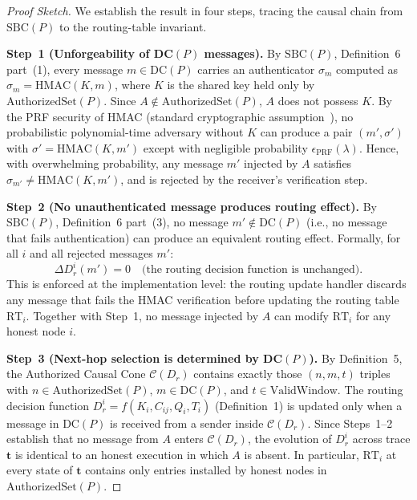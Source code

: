 \begin{proof}[Proof Sketch]
We establish the result in four steps, tracing the causal chain from
$\mathrm{SBC}(P)$ to the routing-table invariant.

\medskip
\noindent\textbf{Step~1 (Unforgeability of DC$(P)$ messages).}\;
By $\mathrm{SBC}(P)$, Definition~6 part~(1), every message $m \in \mathrm{DC}(P)$
carries an authenticator $\sigma_{m}$ computed as
$\sigma_{m} = \mathrm{HMAC}(K, m)$,
where $K$ is the shared key held only by $\mathrm{AuthorizedSet}(P)$.
Since $A \notin \mathrm{AuthorizedSet}(P)$, $A$ does not possess $K$.
By the PRF security of HMAC (standard cryptographic assumption~\cite{bellare1996keying}),
no probabilistic polynomial-time adversary without $K$ can produce a pair
$(m', \sigma')$ with $\sigma' = \mathrm{HMAC}(K, m')$ except with negligible
probability $\epsilon_{\mathrm{PRF}}(\lambda)$.
Hence, with overwhelming probability, any message $m'$ injected by $A$ satisfies
$\sigma_{m'} \neq \mathrm{HMAC}(K, m')$, and is rejected by the receiver's
verification step.

\medskip
\noindent\textbf{Step~2 (No unauthenticated message produces routing effect).}\;
By $\mathrm{SBC}(P)$, Definition~6 part~(3), no message $m' \notin \mathrm{DC}(P)$
(i.e., no message that fails authentication) can produce an equivalent routing
effect.
Formally, for all $i$ and all rejected messages $m'$:
\[
  \Delta D_{r}^{i}(m') = 0
  \quad
  \text{(the routing decision function is unchanged).}
\]
This is enforced at the implementation level: the routing update handler
discards any message that fails the HMAC verification before updating the
routing table $\mathrm{RT}_{i}$.
Together with Step~1, no message injected by $A$ can modify $\mathrm{RT}_{i}$
for any honest node $i$.

\medskip
\noindent\textbf{Step~3 (Next-hop selection is determined by DC$(P)$).}\;
By Definition~5, the Authorized Causal Cone $\mathcal{C}(D_{r})$ contains
exactly those $(n, m, t)$ triples with $n \in \mathrm{AuthorizedSet}(P)$,
$m \in \mathrm{DC}(P)$, and $t \in \mathrm{ValidWindow}$.
The routing decision function $D_{r}^{i} = f(K_{i}, C_{ij}, Q_{i}, T_{i})$
(Definition~1) is updated only when a message in $\mathrm{DC}(P)$ is received from
a sender inside $\mathcal{C}(D_{r})$.
Since Steps~1--2 establish that no message from $A$ enters $\mathcal{C}(D_{r})$,
the evolution of $D_{r}^{i}$ across trace $\mathbf{t}$ is identical to an
honest execution in which $A$ is absent.
In particular, $\mathrm{RT}_{i}$ at every state of $\mathbf{t}$ contains only
entries installed by honest nodes in $\mathrm{AuthorizedSet}(P)$.


\end{proof}

